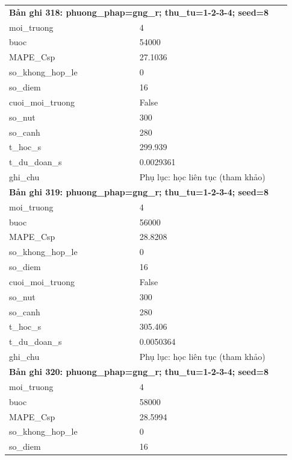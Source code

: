 \begin{longtable}{p{0.43\linewidth}p{0.50\linewidth}}
\midrule
\multicolumn{2}{p{0.95\linewidth}}{\textbf{Bản ghi 318: phuong\_phap=gng\_r; thu\_tu=1-2-3-4; seed=8}} \\
moi\_\allowbreak truong & 4 \\
buoc & 54000 \\
MAPE\_\allowbreak Csp & 27.1036 \\
so\_\allowbreak khong\_\allowbreak hop\_\allowbreak le & 0 \\
so\_\allowbreak diem & 16 \\
cuoi\_\allowbreak moi\_\allowbreak truong & False \\
so\_\allowbreak nut & 300 \\
so\_\allowbreak canh & 280 \\
t\_\allowbreak hoc\_\allowbreak s & 299.939 \\
t\_\allowbreak du\_\allowbreak doan\_\allowbreak s & 0.0029361 \\
ghi\_\allowbreak chu & Phụ lục: học liên tục (tham khảo) \\
\midrule
\multicolumn{2}{p{0.95\linewidth}}{\textbf{Bản ghi 319: phuong\_phap=gng\_r; thu\_tu=1-2-3-4; seed=8}} \\
moi\_\allowbreak truong & 4 \\
buoc & 56000 \\
MAPE\_\allowbreak Csp & 28.8208 \\
so\_\allowbreak khong\_\allowbreak hop\_\allowbreak le & 0 \\
so\_\allowbreak diem & 16 \\
cuoi\_\allowbreak moi\_\allowbreak truong & False \\
so\_\allowbreak nut & 300 \\
so\_\allowbreak canh & 280 \\
t\_\allowbreak hoc\_\allowbreak s & 305.406 \\
t\_\allowbreak du\_\allowbreak doan\_\allowbreak s & 0.0050364 \\
ghi\_\allowbreak chu & Phụ lục: học liên tục (tham khảo) \\
\midrule
\multicolumn{2}{p{0.95\linewidth}}{\textbf{Bản ghi 320: phuong\_phap=gng\_r; thu\_tu=1-2-3-4; seed=8}} \\
moi\_\allowbreak truong & 4 \\
buoc & 58000 \\
MAPE\_\allowbreak Csp & 28.5994 \\
so\_\allowbreak khong\_\allowbreak hop\_\allowbreak le & 0 \\
so\_\allowbreak diem & 16 \\

\end{longtable}
